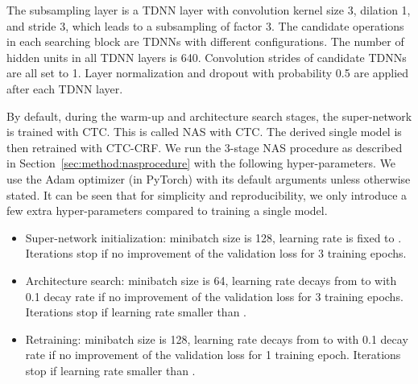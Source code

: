 \documentclass{article}
\newcommand{\secref}{Section~\ref}
\begin{document}
The subsampling layer is a TDNN layer with convolution kernel size 3, dilation 1, and stride 3, which leads to a subsampling of factor 3.
The candidate operations in each searching block are TDNNs with different configurations.
The number of hidden units in all TDNN layers is 640.
Convolution strides of candidate TDNNs are all set to 1.
Layer normalization and dropout with probability 0.5 are applied after each TDNN layer.

By default, during the warm-up and architecture search stages, the super-network is trained with CTC. This is called NAS with CTC.
The derived single model is then retrained with CTC-CRF.
We run the 3-stage NAS procedure as described in \secref{sec:method:nasprocedure} with the following hyper-parameters. We use the Adam optimizer (in PyTorch) with its default arguments unless otherwise stated. It can be seen that for simplicity and reproducibility, we only introduce a few extra hyper-parameters compared to training a single model.
\begin{itemize}
    \item Super-network initialization: minibatch size is 128, learning rate is fixed to . Iterations stop if no improvement of the validation loss for 3 training epochs.
    \item Architecture search: minibatch size is 64, learning rate decays from  to  with 0.1 decay rate if no improvement of the validation loss for 3 training epochs. Iterations stop if learning rate smaller than .
    \item Retraining: minibatch size is 128, learning rate decays from  to  with 0.1 decay rate if no improvement of the validation loss for 1 training epoch. Iterations stop if learning rate smaller than .
\end{itemize}


\vspace{-2mm}
\end{document}
